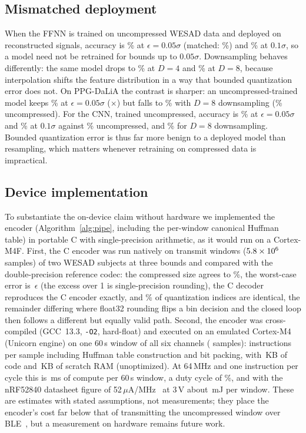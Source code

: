 \documentclass[journal]{IEEEtran}
\begin{document}
\subsection{Mismatched deployment}
When the FFNN is trained on uncompressed WESAD data and deployed on reconstructed signals, accuracy is \accMMEd\% at $\epsilon=0.05\sigma$ (matched: \accEd\%) and \accMMEe\% at $0.1\sigma$, so a model need not be retrained for bounds up to $0.05\sigma$. Downsampling behaves differently: the same model drops to \dsAccMMC\% at $D=4$ and \dsAccMME\% at $D=8$, because interpolation shifts the feature distribution in a way that bounded quantization error does not. On PPG-DaLiA the contrast is sharper: an uncompressed-trained model keeps \daliaAccMMEd\% at $\epsilon=0.05\sigma$ (\daliaRatioEd$\times$) but falls to \daliaDsAccMMH\% with $D=8$ downsampling (\daliaRawAcc\% uncompressed). For the CNN, trained uncompressed, accuracy is \cnnAccMMEd\% at $\epsilon=0.05\sigma$ and \cnnAccMMEe\% at $0.1\sigma$ against \cnnRawAcc\% uncompressed, and \cnnDsAccMMH\% for $D=8$ downsampling. Bounded quantization error is thus far more benign to a deployed model than resampling, which matters whenever retraining on compressed data is impractical.

\subsection{Device implementation}
To substantiate the on-device claim without hardware we implemented the encoder (Algorithm~\ref{alg:pipe}, including the per-window canonical Huffman table) in portable C with single-precision arithmetic, as it would run on a Cortex-M4F. First, the C encoder was run natively on \fwTestWindows{} transmit windows ($5.8\times10^{6}$ samples) of two WESAD subjects at three bounds and compared with the double-precision reference codec: the compressed size agrees to \fwBitsRelDiff\%, the worst-case error is \fwMaxErr\,$\epsilon$ (the excess over 1 is single-precision rounding), the C decoder reproduces the C encoder exactly, and \fwIdentical\% of quantization indices are identical, the remainder differing where float32 rounding flips a bin decision and the closed loop then follows a different but equally valid path. Second, the encoder was cross-compiled (GCC~13.3, \texttt{-O2}, hard-float) and executed on an emulated Cortex-M4 (Unicorn engine) on one 60\,s window of all six channels (\fwWindowSamples{} samples): \fwInstrPerSample{} instructions per sample including Huffman table construction and bit packing, with \fwCodeKB\,KB of code and \fwRamKB\,KB of scratch RAM (unoptimized). At 64\,MHz and one instruction per cycle this is \fwTimeMs\,ms of compute per 60\,s window, a duty cycle of \fwDuty\%, and with the nRF52840 datasheet figure of 52\,$\mu$A/MHz~\cite{nrf52840} at 3\,V about \fwEnergyMJ\,mJ per window. These are estimates with stated assumptions, not measurements; they place the encoder's cost far below that of transmitting the uncompressed window over BLE~\cite{siekkinen2012}, but a measurement on hardware remains future work.
\end{document}
